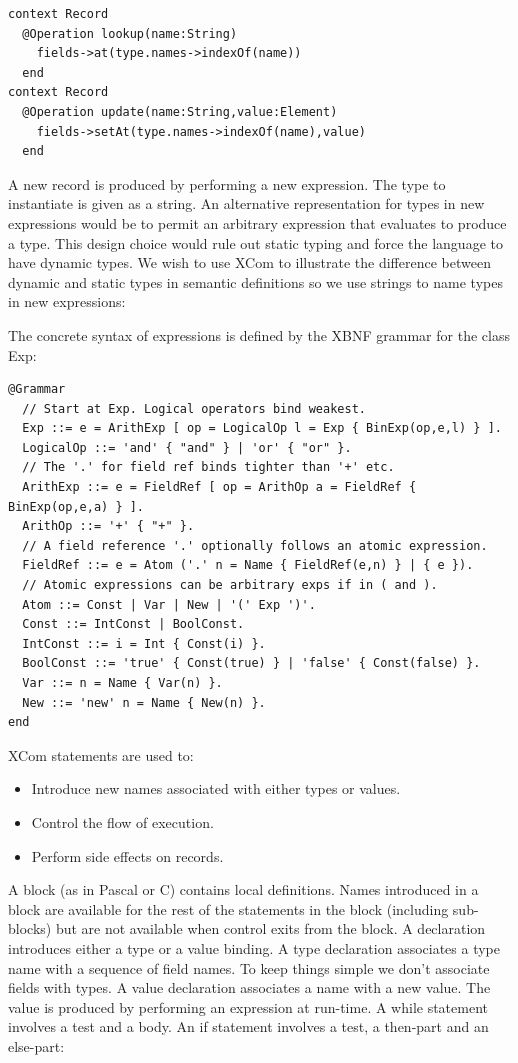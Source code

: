 \begin{lstlisting}
context Record
  @Operation lookup(name:String)
    fields->at(type.names->indexOf(name))
  end
context Record
  @Operation update(name:String,value:Element)
    fields->setAt(type.names->indexOf(name),value)
  end
\end{lstlisting}A new record is produced by performing a new
expression. The type to instantiate is given as a string. An alternative
representation for types in new expressions
would be to permit an arbitrary expression that
evaluates to produce a type. This design choice would rule out static
typing and force the language to have dynamic types. We wish to use
XCom to illustrate the difference between dynamic and static types
in semantic definitions so we use strings to name types in 
new expressions:

The concrete syntax of expressions is defined by the XBNF grammar
for the class Exp:

\begin{lstlisting}
@Grammar 
  // Start at Exp. Logical operators bind weakest.
  Exp ::= e = ArithExp [ op = LogicalOp l = Exp { BinExp(op,e,l) } ].
  LogicalOp ::= 'and' { "and" } | 'or' { "or" }.
  // The '.' for field ref binds tighter than '+' etc.
  ArithExp ::= e = FieldRef [ op = ArithOp a = FieldRef { BinExp(op,e,a) } ].
  ArithOp ::= '+' { "+" }.
  // A field reference '.' optionally follows an atomic expression.
  FieldRef ::= e = Atom ('.' n = Name { FieldRef(e,n) } | { e }).
  // Atomic expressions can be arbitrary exps if in ( and ).
  Atom ::= Const | Var | New | '(' Exp ')'.
  Const ::= IntConst | BoolConst.
  IntConst ::= i = Int { Const(i) }.
  BoolConst ::= 'true' { Const(true) } | 'false' { Const(false) }.
  Var ::= n = Name { Var(n) }.
  New ::= 'new' n = Name { New(n) }.
end
\end{lstlisting}
XCom statements are used to:

\begin{itemize}
\item Introduce new names associated with either types or values.
\item Control the flow of execution.
\item Perform side effects on records.
\end{itemize}
A block (as in Pascal or C) contains local definitions. Names introduced
in a block are available for the rest of the statements in the block
(including sub-blocks) but are not available when control exits from
the block. A declaration introduces either a type or a value binding.
A type declaration associates a type name with a sequence of field
names. To keep things simple we don't associate fields with types.
A value declaration associates a name with a new value. The value
is produced by performing an expression at run-time. A while statement
involves a test and a body. An if statement involves a test, a then-part
and an else-part:


